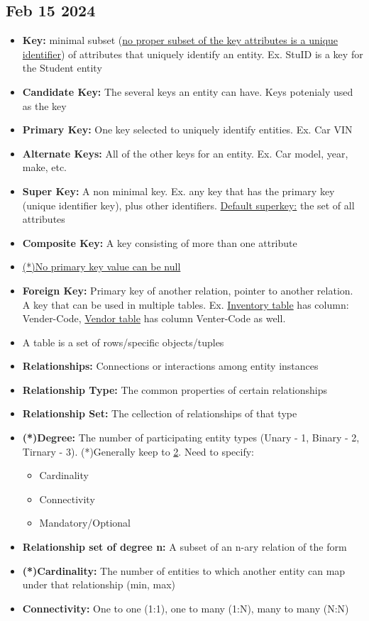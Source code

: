 \documentclass[12pt]{article}
\begin{document}
\subsection*{Feb 15 2024}

\begin{itemize}
		  \item \textbf{Key:} minimal subset (\underline{no proper subset of the key attributes
					 is a unique identifier}) of attributes that uniquely identify an entity. Ex.
					StuID is a key for the Student entity
		 \item \textbf{Candidate Key:} The several keys an entity can have. Keys potenialy used as the key
		 \item \textbf{Primary Key:} One key selected to uniquely identify entities. Ex. Car VIN
		 \item \textbf{Alternate Keys:} All of the other keys for an entity. Ex. Car model, year, make, etc. 
		 \item \textbf{Super Key:} A non minimal key. Ex. any key that has the primary key (unique
					identifier key), plus other identifiers. \underline{Default superkey:} the set of
					 all attributes
		 \item \textbf{Composite Key:} A key consisting of more than one attribute
		 \item \underline{(*)No primary key value can be null}
		 \item \textbf{Foreign Key:} Primary key of another relation, pointer to another relation.
					A key that can be used in multiple tables. Ex. \underline{Inventory table} has column: Vender-Code,
					 \underline{Vendor table} has column Venter-Code as well.
		 \item A table is a set of rows/specific objects/tuples
		 \item \textbf{Relationships:} Connections or interactions among entity instances
		 \item \textbf{Relationship Type:} The common properties of certain relationships 
		 \item \textbf{Relationship Set:} The cellection of relationships of that type
		 \item \textbf{(*)Degree:} The number of participating entity types (Unary - 1, Binary - 2, Tirnary - 3).
					(*)Generally keep to \underline{2}. Need to specify:
					 \begin{itemize}
								\item Cardinality
								\item Connectivity
								\item Mandatory/Optional
					 \end{itemize}
		  \item \textbf{Relationship set of degree n:} A subset of an n-ary relation of the form
		  \item \textbf{(*)Cardinality:} The number of entities to which another entity can map under
					 that relationship (min, max)
		  \item \textbf{Connectivity:} One to one (1:1), one to many (1:N), many to many (N:N)
\end{itemize}
\end{document}
